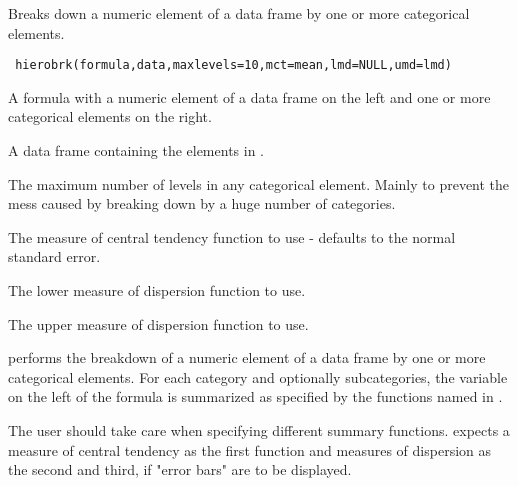 \begin{Description}\relax
Breaks down a numeric element of a data frame by one or more
categorical elements.
\end{Description}
\begin{Usage}
\begin{verbatim}
 hierobrk(formula,data,maxlevels=10,mct=mean,lmd=NULL,umd=lmd)
\end{verbatim}
\end{Usage}
\begin{Arguments}
\begin{ldescription}
\item[\code{formula}] A formula with a numeric element of a data frame on the left and
one or more categorical elements on the right.
\item[\code{data}] A data frame containing the elements in .
\item[\code{maxlevels}] The maximum number of levels in any categorical element. Mainly to
prevent the mess caused by breaking down by a huge number of categories.
\item[\code{mct}] The measure of central tendency function to use - defaults to the
normal standard error.
\item[\code{lmd}] The lower measure of dispersion function to use.
\item[\code{umd}] The upper measure of dispersion function to use.
\end{ldescription}
\end{Arguments}
\begin{Details}\relax
{} performs the breakdown of a numeric element of a data frame by one
or more categorical elements. For each category and optionally subcategories, the
variable on the left of the formula is summarized as specified by the functions
named in .

The user should take care when specifying different summary functions.
 expects a measure of central tendency as the first function and
measures of dispersion as the second and third, if "error bars" are to be displayed.
\end{Details}
